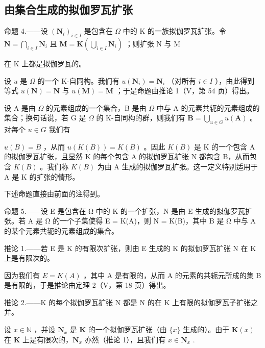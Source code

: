 \subsection{由集合生成的拟伽罗瓦扩张}

命题 4.——设 \((\mathbf{N}_i)_{i\in I}\) 是包含在 \(\Omega\) 中的 K 的一族拟伽罗瓦扩张。令 \(\mathbf{N} = \bigcap_{i\in I}\mathbf{N}_i\) 且 \(\mathbf{M} = \mathbf{K}\left(\bigcup_{i\in I}\mathbf{N}_i\right)\) ；则扩张 N 与 M

在 K 上都是拟伽罗瓦的。

设 \(u\) 是 \(\Omega\) 的一个 K-自同构。我们有 \(u(\mathbf{N}_i) = \mathbf{N}_i\) （对所有 \(i \in I\) ），由此得到等式 \(u(\mathbf{N}) = \mathbf{N}\) 与 \(u(\mathbf{M}) = \mathbf{M}\) ；于是命题由推论 1（V，第 54 页）得出。

设 A 是由 \(\Omega\) 的元素组成的一个集合，B 是由 \(\Omega\) 中与 A 的元素共轭的元素组成的集合；换句话说，若 G 是 \(\Omega\) 的 K-自同构的群，则我们有 \(\mathbf{B} = \bigcup_{u \in G} u(\mathbf{A})\) 。对每个 \(u \in G\) 我们有

\(u(B) = B\) ，从而 \(u(K(B)) = K(B)\) 。因此 \(K(B)\) 是 K 的一个包含 A 的拟伽罗瓦扩张，且显然 K 的每个包含 A 的拟伽罗瓦扩张 N 都包含 B，从而包含 \(K(B)\) 。我们称 \(K(B)\) 为由 A 生成的拟伽罗瓦扩张。这一定义特别适用于 A 是 K 的扩张的情形。

下述命题直接由前面的注得到。

命题 5.——设 E 是包含在 Ω 中的 K 的一个扩张，N 是由 E 生成的拟伽罗瓦扩张。若 A 是 Ω 的一个子集使得 E = K(A)，则 N = K(B)，其中 B 是 Ω 中与 A 的某个元素共轭的元素组成的集合。

推论 1.——若 E 是 K 的有限次扩张，则由 E 生成的 K 的拟伽罗瓦扩张 N 在 K 上是有限次的。

因为我们有 \(E = K(A)\) ，其中 A 是有限的，从而 A 的元素的共轭元所成的集 B 是有限的，于是推论由定理 2（V，第 18 页）得出。

推论 2.——K 的每个拟伽罗瓦扩张 N 都是 N 的在 K 上有限的拟伽罗瓦子扩张之并。

设 \(x \in \mathbb{N}\) ，并设 \(\mathbf{N}_x\) 是 \(\mathbf{K}\) 的一个拟伽罗瓦扩张（由 \(\{x\}\) 生成的）。由于 \(\mathbf{K}(x)\) 在 \(\mathbf{K}\) 上是有限次的，\(\mathbf{N}_x\) 亦然（推论 1），且我们有 \(x \in \mathbf{N}_x\) .

